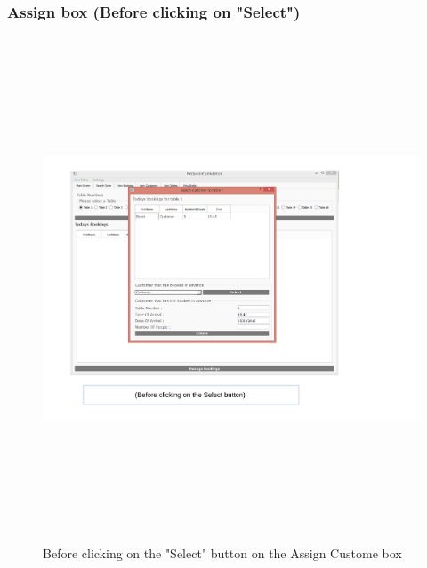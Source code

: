 \begin{landscape}
\subsubsection{Assign box (Before clicking on "Select")}
\begin{figure}[H]
    \includegraphics[height = 15cm]{./Maintenance/images/screen15}
    \caption{Before clicking on the "Select" button on the Assign Custome box} \label{fig:screen15}
\end{figure}


\end{landscape}
